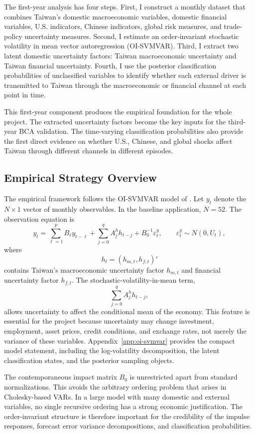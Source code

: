 \documentclass[12pt]{article}
\begin{document}
The first-year analysis has four steps. First, I construct a monthly dataset that combines Taiwan's
domestic macroeconomic variables, domestic financial variables, U.S. indicators, Chinese
indicators, global risk measures, and trade-policy uncertainty measures. Second, I estimate an
order-invariant stochastic volatility in mean vector autoregression (OI-SVMVAR). Third, I extract
two latent domestic uncertainty factors: Taiwan macroeconomic uncertainty and Taiwan financial
uncertainty. Fourth, I use the posterior classification probabilities of unclassified variables to
identify whether each external driver is transmitted to Taiwan through the macroeconomic or
financial channel at each point in time.

This first-year component produces the empirical foundation for the whole project. The extracted
uncertainty factors become the key inputs for the third-year BCA validation. The time-varying
classification probabilities also provide the first direct evidence on whether U.S., Chinese, and
global shocks affect Taiwan through different channels in different episodes.

\subsection{Empirical Strategy Overview}

The empirical framework follows the OI-SVMVAR model of
\citet{davidson2025investigating}. Let $y_t$ denote the $N \times 1$ vector of
monthly observables. In the baseline application, $N=52$. The observation equation is
\[
y_t
=
\sum_{\ell=1}^{p} B_\ell y_{t-\ell}
+
\sum_{j=0}^{q} A^h_j h_{t-j}
+
B_0^{-1}\varepsilon^y_t,
\qquad
\varepsilon^y_t \sim N(0,U_t),
\]
where
\[
h_t = (h_{m,t},h_{f,t})'
\]
contains Taiwan's macroeconomic uncertainty factor $h_{m,t}$ and financial uncertainty factor
$h_{f,t}$. The stochastic-volatility-in-mean term,
\[
\sum_{j=0}^{q} A^h_j h_{t-j},
\]
allows uncertainty to affect the conditional mean of the economy. This feature is essential for
the project because uncertainty may change investment, employment, asset prices, credit
conditions, and exchange rates, not merely the variance of these variables.
Appendix~\ref{app:oi-svmvar} provides the compact model statement, including the
log-volatility decomposition, the latent classification states, and the posterior sampling objects.

The contemporaneous impact matrix $B_0$ is unrestricted apart from standard normalizations.
This avoids the arbitrary ordering problem that arises in Cholesky-based VARs. In a large model
with many domestic and external variables, no single recursive ordering has a strong economic
justification. The order-invariant structure is therefore important for the credibility of the impulse
responses, forecast error variance decompositions, and classification probabilities.
\end{document}
